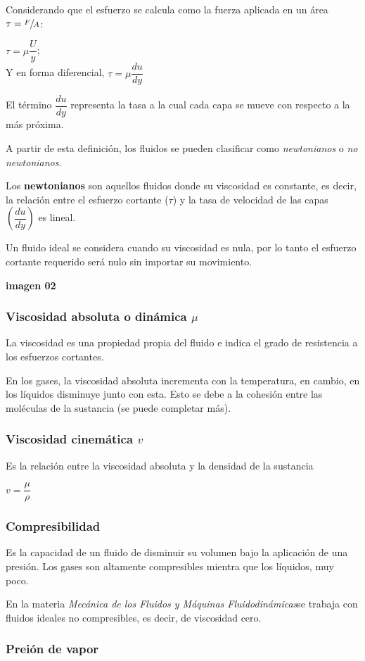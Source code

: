 \documentclass[11pt,a4paper]{article}
\newcommand{\materia}{\textit{Mecánica de los Fluidos y Máquinas Fluidodinámicas}}
\begin{document}
Considerando que el esfuerzo se calcula como la fuerza aplicada en un área $\tau = \sfrac{F}{A}$:
\begin{center}
	$\tau = \mu \dfrac{U}{y}$;\\ Y en forma diferencial, $\tau = \mu \dfrac{du}{dy}$
\end{center}

El término $\dfrac{du}{dy}$ representa la tasa a la cual cada capa se mueve con respecto a la más próxima.\\ \vspace{.5cm}

A partir de esta definición, los fluidos se pueden clasificar como \textit{newtonianos} o \textit{no newtonianos}.


Los \textbf{newtonianos} son aquellos fluidos donde su viscosidad es constante, es decir, la relación entre el esfuerzo cortante ($\tau$) y la tasa de velocidad de las capas $\left(\dfrac{du}{dy}\right)$ es lineal.

Un fluido ideal se considera cuando su viscosidad es nula, por lo tanto el esfuerzo cortante requerido será nulo sin importar su movimiento.

\begin{center}
	\textbf{imagen 02}
\end{center}

\subsubsection{Viscosidad absoluta o dinámica $\mu$}
	La viscosidad es una propiedad propia del fluido e indica el grado de resistencia a los esfuerzos cortantes.

	En los gases, la viscosidad absoluta incrementa con la temperatura, en cambio, en los líquidos disminuye junto con esta. Esto se debe a la cohesión entre las moléculas de la sustancia (se puede completar más).
	
\subsubsection{Viscosidad cinemática $v$}

	Es la relación entre la viscosidad absoluta y la densidad de la sustancia
	\begin{center}
		$v = \dfrac{\mu}{\rho}$
	\end{center}

\subsubsection{Compresibilidad}
	Es la capacidad de un fluido de disminuir su volumen bajo la aplicación de una presión. Los gases son altamente compresibles mientra que los líquidos, muy poco. 
	
	En la materia \materia se trabaja con fluidos ideales no compresibles, es decir, de viscosidad cero.

\subsubsection{Preión de vapor}
\end{document}
